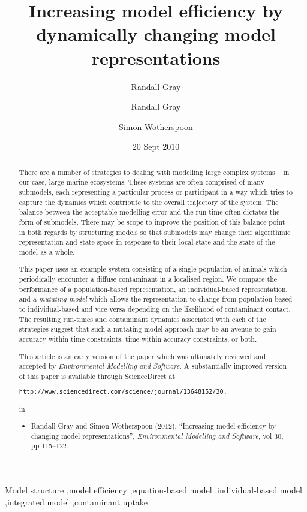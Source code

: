 \documentclass[authoryear,5p,twocolumn]{elsarticle}
\begin{document}
\begin{frontmatter}
\title{Increasing model efficiency by dynamically changing model representations}
\date{20 Sept 2010}
\author{Randall Gray}
\author{Randall Gray}
\address{CSIRO Division of Marine and Atmospheric Research}
\author{Simon Wotherspoon}
\address{University of Tasmania}
\begin{abstract}
  There are a number of strategies to dealing with modelling large complex systems -- in our case, large marine
  ecosystems. These systems are often comprised of many submodels, each representing a particular process or
  participant in a way which tries to capture the dynamics which contribute to the overall trajectory of the system.
  The balance between the acceptable modelling error and the run-time often dictates the form of submodels. There may
  be scope to improve the position of this balance point in both regards by structuring models so that submodels may
  change their algorithmic representation and state space in response to their local state and the state of the model
  as a whole.
  
  This paper uses an example system consisting of a single population of animals which periodically encounter a diffuse
  contaminant in a localised region. We compare the performance of a population-based representation, an
  individual-based representation, and a {\em{mutating model}} which allows the representation to change from
  population-based to individual-based and vice versa depending on the likelihood of contaminant contact. The resulting
  run-times and contaminant dynamics associated with each of the strategies suggest that such a mutating model approach
  may be an avenue to gain accuracy within time constraints, time within accuracy constraints, or both.

  \vskip0.5cm
  This article is an early version of the paper which was ultimately 
  reviewed and accepted by \emph{Environmental Modelling and
    Software}.  A substantially improved version of this paper    
  is available through ScienceDirect at 

  \begin{verbatim}http://www.sciencedirect.com/science/journal/13648152/30.\end{verbatim}
  in 
  
  \begin{itemize}
  \item[ ]  Randall Gray and Simon Wotherspoon (2012), ``Increasing model
    efficiency by changing model representations'',
    \emph{Environmental Modelling and Software}, vol 30, pp 115--122.
  \end{itemize}
    
\end{abstract}
\begin{keyword}
Model structure \sep model efficiency \sep equation-based model \sep individual-based model \sep integrated model \sep contaminant uptake
\end{keyword}
\end{frontmatter}
\end{document}
